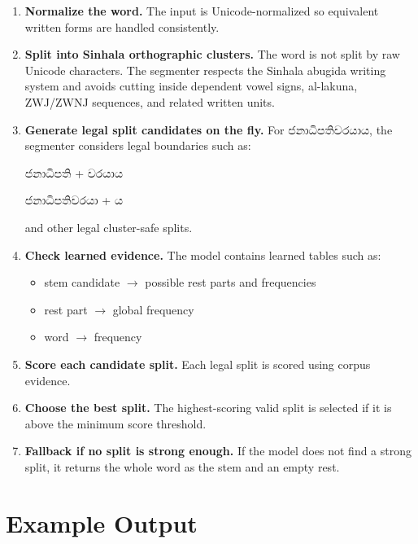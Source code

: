 \documentclass[11pt]{article}
\newcommand{\si}[1]{{\sinhalafont #1}}
\begin{document}
\begin{enumerate}
  \item \textbf{Normalize the word.}
  The input is Unicode-normalized so equivalent written forms are handled
  consistently.

  \item \textbf{Split into Sinhala orthographic clusters.}
  The word is not split by raw Unicode characters. The segmenter respects the
  Sinhala abugida writing system and avoids cutting inside dependent vowel
  signs, al-lakuna, ZWJ/ZWNJ sequences, and related written units.

  \item \textbf{Generate legal split candidates on the fly.}
  For \si{ජනාධිපතිවරයාය}, the segmenter considers legal boundaries such as:

  \begin{center}
  \large \si{ජනාධිපති} + \si{වරයාය}
  \end{center}

  \begin{center}
  \large \si{ජනාධිපතිවරයා} + \si{ය}
  \end{center}

  and other legal cluster-safe splits.

  \item \textbf{Check learned evidence.}
  The model contains learned tables such as:
  \begin{itemize}
    \item stem candidate $\rightarrow$ possible rest parts and frequencies
    \item rest part $\rightarrow$ global frequency
    \item word $\rightarrow$ frequency
  \end{itemize}

  \item \textbf{Score each candidate split.}
  Each legal split is scored using corpus evidence.

  \item \textbf{Choose the best split.}
  The highest-scoring valid split is selected if it is above the minimum score
  threshold.

  \item \textbf{Fallback if no split is strong enough.}
  If the model does not find a strong split, it returns the whole word as the
  stem and an empty rest.
\end{enumerate}

\section*{Example Output}
\end{document}
